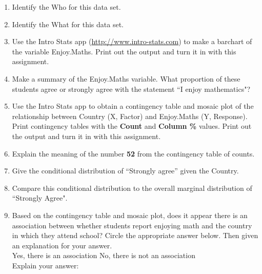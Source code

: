 \documentclass{article}
\begin{document}
\begin{enumerate}
\item Identify the Who for this data set.\\[0.5in]

\item Identify the What for this data set.\\[0.5in]

\item Use the Intro Stats app (\url{http://www.intro-stats.com}) to make a barchart of the variable Enjoy.Maths.  Print out the output and turn it in with this assignment.\\[1em]  

\item Make a summary of the Enjoy.Maths variable. What proportion of these students agree or strongly agree with the statement ``I enjoy mathematics"?\\[0.5in]

\item Use the Intro Stats app to obtain a contingency table and mosaic plot of the relationship between Country (X, Factor) and Enjoy.Maths (Y, Response).  
Print contingency tables with the {\bf Count} and {\bf Column \%} values.  Print out the output and turn it in with this assignment. \\[1em] 

\item Explain the meaning of the number {\bf 52} from the contingency table of counts.\\[0.5in] 


\item Give the conditional distribution of ``Strongly agree'' given the Country. \\[1in] 


\item Compare this conditional distribution to the overall marginal distribution of ``Strongly Agree". \\[1in]

\item Based on the contingency table and mosaic plot, does it appear there is an association between whether students report enjoying math and the country in which they attend school?  Circle the appropriate answer below.  Then given an explanation for your answer.\\[0.5em]

\hspace{1in} Yes, there is an association \hspace{1in} No, there is not an association \\[0.5em]

Explain your answer:

\end{enumerate}
\end{document}
